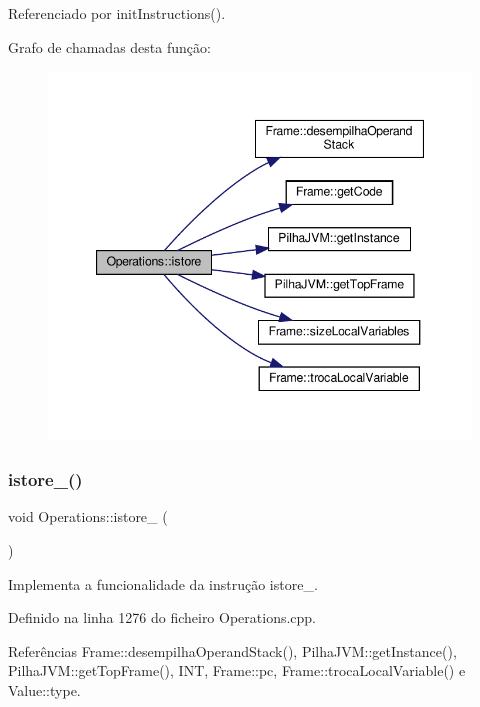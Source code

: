 Referenciado por init\+Instructions().

Grafo de chamadas desta função\+:
\nopagebreak
\begin{figure}[H]
\begin{center}
\leavevmode
\includegraphics[width=347pt]{classOperations_a1547cbd0fa84e551f218d472a5187efa_cgraph}
\end{center}
\end{figure}
\mbox{\label{classOperations_ae0a17c510b570467f5b025e3dcbe1398}} 
\subsubsection{\texorpdfstring{istore\+\_()}{istore\_0()}}
{\footnotesize\ttfamily void Operations\+::istore\+\_ (\begin{DoxyParamCaption}{ }\end{DoxyParamCaption})\hspace{0.3cm}{\ttfamily [private]}}



Implementa a funcionalidade da instrução istore\+\_. 



Definido na linha 1276 do ficheiro Operations.\+cpp.



Referências Frame\+::desempilha\+Operand\+Stack(), Pilha\+J\+V\+M\+::get\+Instance(), Pilha\+J\+V\+M\+::get\+Top\+Frame(), I\+NT, Frame\+::pc, Frame\+::troca\+Local\+Variable() e Value\+::type.



